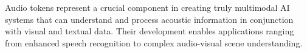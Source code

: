 \begin{comment}
Implementing effective audio tokens requires adherence to several key principles:

\begin{enumerate}
\item \textbf{Feature Diversity}: Start with log-Mel spectrograms as a strong, general-purpose feature. If your task involves music, consider adding features like chroma or pitch to provide more relevant information to the model
\item \textbf{Temporal Alignment}: When working with video, be aware of potential audio-visual desynchronization in your dataset. A common preprocessing step is to use a tool like FFmpeg to verify and correct the alignment between audio and video streams
\item \textbf{Noise Robustness}: Incorporate audio-specific data augmentation during training. Libraries like \texttt{audiomentations} can add background noise, reverberation, and pitch shifts, which can significantly improve the model's real-world performance
\item \textbf{Scale Invariance}: Handle audio of different durations and sampling rates
\item \textbf{Domain Adaptation}: Fine-tune for specific audio domains (speech, music, environmental)
\item \textbf{Efficient Processing}: Optimize for real-time applications when required
\item \textbf{Cross-Modal Validation}: Evaluate performance on multimodal tasks
\item \textbf{Interpretability}: Monitor attention patterns between audio and other modalities
\end{enumerate}
\begin{comment}
Feedback: This is a great list. To make it more actionable:
1.  **Feature Diversity**: "Start with log-Mel spectrograms as a strong, general-purpose feature. If your task involves music, consider adding features like chroma or pitch to provide more relevant information to the model."
2.  **Temporal Alignment**: "When working with video, be aware of potential audio-visual desynchronization in your dataset. A common preprocessing step is to use a tool like FFmpeg to verify and correct the alignment between audio and video streams."
3.  **Noise Robustness**: "Incorporate audio-specific data augmentation during training. Libraries like `audiomentations` can add background noise, reverberation, and pitch shifts, which can significantly improve the model's real-world performance."

STATUS: addressed - enhanced the three key recommendations with specific, actionable guidance
\end{comment}

Audio tokens represent a crucial component in creating truly multimodal AI systems that can understand and process acoustic information in conjunction with visual and textual data. Their development enables applications ranging from enhanced speech recognition to complex audio-visual scene understanding.
